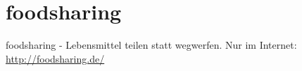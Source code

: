 \section{foodsharing}
foodsharing - Lebensmittel teilen statt wegwerfen. Nur im Internet: \href{http://foodsharing.de/  }{http://foodsharing.de/  }